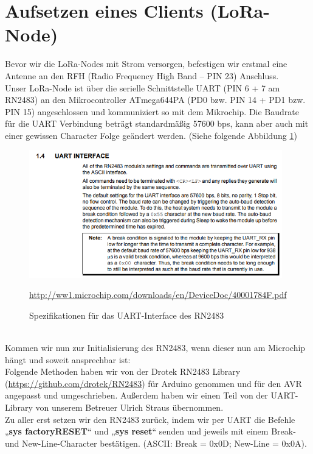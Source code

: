\section{Aufsetzen eines Clients (LoRa-Node)} \label{mac-commands}
Bevor wir die LoRa-Nodes mit Strom versorgen, befestigen wir erstmal eine Antenne an den RFH (Radio Frequency High Band – PIN 23) Anschluss.\\
Unser LoRa-Node ist über die serielle Schnittstelle UART (PIN 6 + 7 am RN2483) an den Mikrocontroller ATmega644PA (PD0 bzw. PIN 14 + PD1 bzw. PIN 15) angeschlossen und kommuniziert so mit dem Mikrochip. Die Baudrate für die UART Verbindung beträgt standardmäßig 57600 bps, kann aber auch mit einer gewissen Character Folge geändert werden. (Siehe folgende Abbildung \ref{fig:UART})
\begin{figure}[ht]
    \center
    \includegraphics[width=11cm]{Bilder/lora-8.png}\\
    \caption{Spezifikationen für das UART-Interface des RN2483}
    \begin{center} \quelle\url{http://ww1.microchip.com/downloads/en/DeviceDoc/40001784F.pdf} \end{center}
        \label{fig:UART}
\end{figure}\\
Kommen wir nun zur Initialisierung des RN2483, wenn dieser nun am Microchip hängt und soweit ansprechbar ist:\\

\noindent
Folgende Methoden haben wir von der Drotek RN2483 Library (\url{https://github.com/drotek/RN2483}) für Arduino genommen und für den AVR angepasst und umgeschrieben. Außerdem haben wir einen Teil von der UART-Library von unserem Betreuer Ulrich Straus übernommen.\\

\noindent
Zu aller erst setzen wir den RN2483 zurück, indem wir per UART die Befehle „\textbf{sys factoryRESET}“ und „\textbf{sys reset}“ senden und jeweils mit einem Break- und New-Line-Character bestätigen. (ASCII: Break = 0x0D; New-Line = 0x0A).\\

